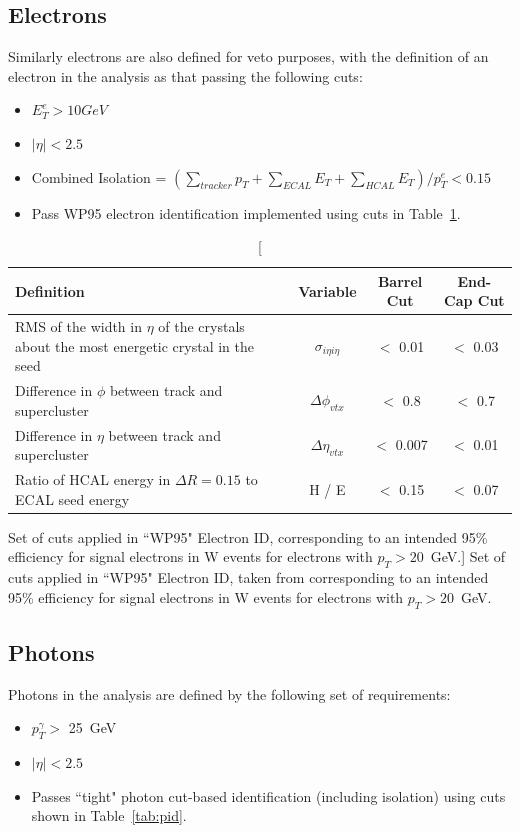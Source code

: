 \subsection{Electrons}
Similarly electrons are also defined for veto purposes, with the definition of an electron in the analysis as that passing the following cuts:

\begin{itemize}
\item $E^{e}_{T} > 10 GeV$
\item $|\eta| < 2.5$
\item Combined Isolation = $(\sum_{tracker} p_{T} + \sum_{ECAL}E_{T} + \sum_{HCAL}E_{T})/p^{e}_{T} < 0.15$
\item Pass WP95 electron identification implemented using cuts in Table~\ref{tab:eid}.
\end{itemize}

\begin{table}[htbp]
\centering
\begin{tabular}{ m{6.9cm} c c c}
\hline
\hline
 \centering Definition & Variable & Barrel Cut & End-Cap Cut \\
\hline
\hline
RMS of the width in $\eta$ of the crystals about the most energetic crystal in the seed& $\sigma_{i \eta i \eta}$ & $<$ 0.01 & $<$ 0.03\\
Difference in $\phi$ between track and supercluster&$\Delta \phi_{vtx}$& $<$ 0.8 & $<$ 0.7 \\
Difference in $\eta$ between track and supercluster& $\Delta \eta_{vtx}$& $<$ 0.007 & $<$ 0.01\\
Ratio of HCAL energy in $\Delta R = 0.15$ to ECAL seed energy & H / E & $<$ 0.15 & $<$ 0.07\\
\hline
\end{tabular}
\caption[Set of cuts applied in ``WP95" Electron ID, corresponding to an intended 95\% efficiency for signal electrons in W events for electrons with $p_{T} > 20$~GeV.]{\label{tab:eid} Set of cuts applied in ``WP95" Electron ID, taken from \cite{AN-10-116} corresponding to an intended 95\% efficiency for signal electrons in W events for electrons with $p_{T} > 20$~GeV.}
\end{table}
\subsection{Photons}

Photons in the analysis are defined by the following set of requirements:
\begin{itemize}
\item $p_{T}^{\gamma} > $ 25~GeV
\item $|\eta| < 2.5$
\item Passes ``tight" photon cut-based identification (including isolation) using cuts shown in Table~\ref{tab:pid}.
\end{itemize}


